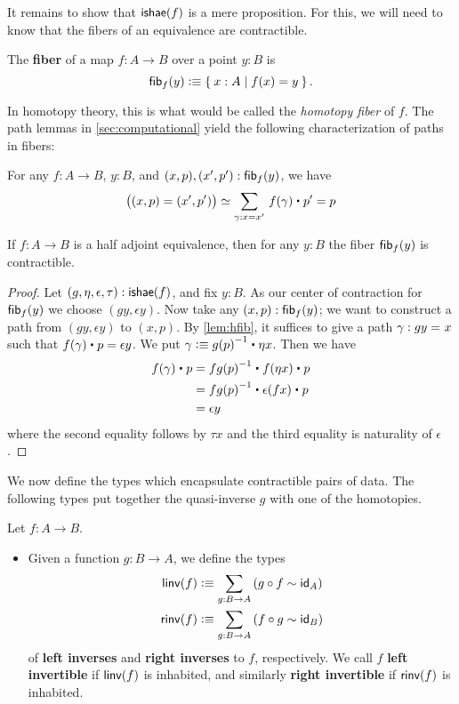 It remains to show that $\mathsf{ishae}(f)$ is a mere proposition.
For this, we will need to know that the fibers of an equivalence are contractible.

\begin{defn}\label{defn:homotopy-fiber}
  The \textbf{fiber} of a map $f:A\to B$ over a point $y:B$ is
  \[ {\mathsf{fib}}_{f}(y) \vcentcolon\equiv \Set{x:A | f(x) = y}.\]
\end{defn}

In homotopy theory, this is what would be called the \emph{homotopy fiber} of $f$.
The path lemmas in \autoref{sec:computational} yield the following characterization of paths in fibers:

\begin{lem}\label{lem:hfib}
  For any $f : A \to B$, $y : B$, and $(x,p),(x',p') : {\mathsf{fib}}_{f}(y)$, we have
  \[ \big((x,p) = (x',p')\big) \simeq \sm{\gamma : x = x'} f(\gamma) \ct p' = p \qedhere\]
\end{lem}

\begin{thm}\label{thm:contr-hae}
  If $f:A\to B$ is a half adjoint equivalence, then for any $y:B$ the fiber ${\mathsf{fib}}_{f}(y)$ is contractible.
\end{thm}
\begin{proof}
  Let $(g,\eta,\epsilon,\tau) : \mathsf{ishae}(f)$, and fix $y : B$.
  As our center of contraction for ${\mathsf{fib}}_{f}(y)$ we choose $(gy, \epsilon y)$.
  Now take any $(x,p) : {\mathsf{fib}}_{f}(y)$; we want to construct a path from $(gy, \epsilon y)$ to $(x,p)$.
  By \autoref{lem:hfib}, it suffices to give a path $\gamma : gy =_{} x$ such that $\ap f\gamma \ct p = \epsilon y$.
  We put $\gamma \defeq \opp{g(p)} \ct \eta x$.
  Then we have 
  \begin{align*}
    f(\gamma) \ct p & = \opp{fg(p)} \ct f (\eta x) \ct p \\
    & = \opp{fg(p)} \ct \epsilon(fx) \ct p \\
    & = \epsilon y
  \end{align*}
  where the second equality follows by $\tau x$ and the third equality is naturality of $\epsilon$.
\end{proof}

We now define the types which encapsulate contractible pairs of data.
The following types put together the quasi-inverse $g$ with one of the homotopies.

\begin{defn}
  Let $f:A\to B$.
  \begin{itemize}
  \item Given a function $g:B\to A$, we define the types 
    \begin{align*}
      \linv(f) &\defeq \sm{g:B\to A} (g\circ f\htpy \idfunc[A])\\
      \rinv(f) &\defeq \sm{g:B\to A} (f\circ g\htpy \idfunc[B])
    \end{align*}
  of \textbf{left inverses} and \textbf{right inverses} to $f$, respectively.
  We call $f$ \textbf{left invertible} if $\mathsf{linv}(f)$ is inhabited, and similarly \textbf{right invertible} if $\mathsf{rinv}(f)$ is inhabited.
  \end{itemize}
\end{defn}

